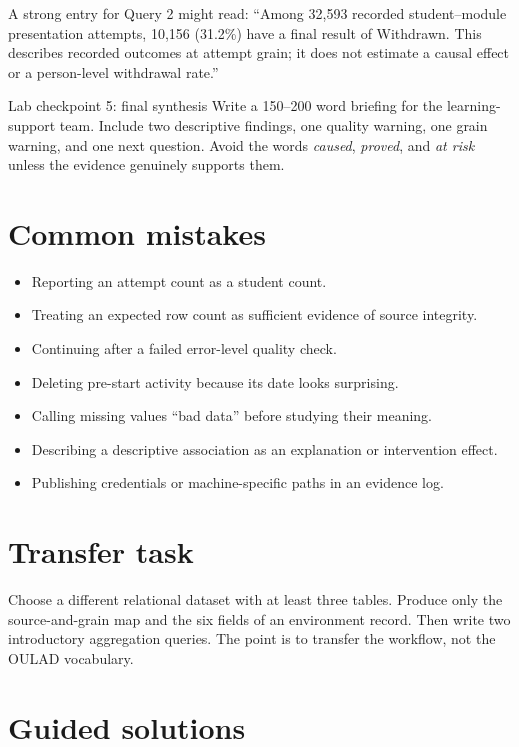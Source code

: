 A strong entry for Query 2 might read: ``Among 32,593 recorded
student--module presentation attempts, 10,156 (31.2\%) have a final result of
Withdrawn. This describes recorded outcomes at attempt grain; it does not
estimate a causal effect or a person-level withdrawal rate.''

\begin{exercisebox}{Lab checkpoint 5: final synthesis}
\label{ex:lab-synthesis}
Write a 150--200 word briefing for the learning-support team. Include two
descriptive findings, one quality warning, one grain warning, and one next
question. Avoid the words \emph{caused}, \emph{proved}, and \emph{at risk}
unless the evidence genuinely supports them.
\end{exercisebox}

\section{Common mistakes}

\begin{itemize}
  \item Reporting an attempt count as a student count.
  \item Treating an expected row count as sufficient evidence of source integrity.
  \item Continuing after a failed error-level quality check.
  \item Deleting pre-start activity because its date looks surprising.
  \item Calling missing values ``bad data'' before studying their meaning.
  \item Describing a descriptive association as an explanation or intervention effect.
  \item Publishing credentials or machine-specific paths in an evidence log.
\end{itemize}

\section{Transfer task}

Choose a different relational dataset with at least three tables. Produce only
the source-and-grain map and the six fields of an environment record. Then
write two introductory aggregation queries. The point is to transfer the
workflow, not the OULAD vocabulary.

\section{Guided solutions}

